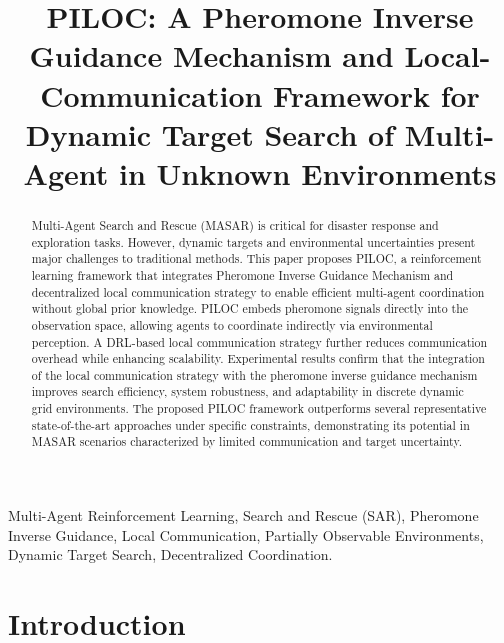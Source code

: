 \documentclass[lettersize,journal]{IEEEtran}
\begin{document}
\title{PILOC: A Pheromone Inverse Guidance Mechanism and Local-Communication Framework for Dynamic Target Search of Multi-Agent in Unknown Environments}




\maketitle
\pagestyle{empty}  %
\thispagestyle{empty} %

\begin{abstract}
Multi-Agent Search and Rescue (MASAR) is critical for disaster response and exploration tasks. However, dynamic targets and environmental uncertainties present major challenges to traditional methods. This paper proposes PILOC, a reinforcement learning framework that integrates Pheromone Inverse Guidance Mechanism and decentralized local communication strategy to enable efficient multi-agent coordination without global prior knowledge.
PILOC embeds pheromone signals directly into the observation space, allowing agents to coordinate indirectly via environmental perception. A DRL-based local communication strategy further reduces communication overhead while enhancing scalability. 
Experimental results confirm that the integration of the local communication strategy with the pheromone inverse guidance mechanism improves search efficiency, system robustness, and adaptability in discrete dynamic grid environments. The proposed PILOC framework outperforms several representative state-of-the-art approaches under specific constraints, demonstrating its potential in MASAR scenarios characterized by limited communication and target uncertainty.

\end{abstract}

\begin{IEEEkeywords}
Multi-Agent Reinforcement Learning, Search and Rescue (SAR), Pheromone Inverse Guidance, Local Communication, Partially Observable Environments, Dynamic Target Search, Decentralized Coordination.
\end{IEEEkeywords}

\section{Introduction}
\end{document}
